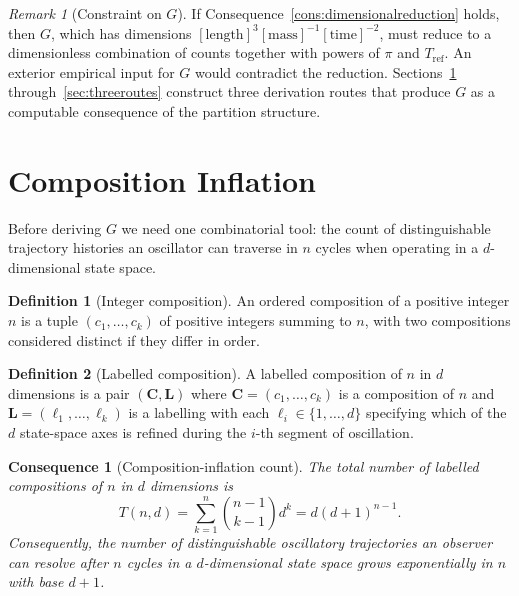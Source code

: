 \documentclass[11pt,twocolumn,a4paper]{article}
\theoremstyle{axiomstyle}
\theoremstyle{conseqstyle}
\newtheorem{consequence}{Consequence}
\theoremstyle{definition}
\newtheorem{definition}{Definition}
\theoremstyle{remark}
\newtheorem*{remark}{Remark}
\begin{document}
\begin{remark}[Constraint on $G$]
If Consequence~\ref{cons:dimensionalreduction} holds, then $G$, which has dimensions $[\text{length}]^{3}[\text{mass}]^{-1}[\text{time}]^{-2}$, must reduce to a dimensionless combination of counts together with powers of $\pi$ and $T_{\mathrm{ref}}$. An exterior empirical input for $G$ would contradict the reduction. Sections~\ref{sec:compositioninflationtheorem} through~\ref{sec:threeroutes} construct three derivation routes that produce $G$ as a computable consequence of the partition structure.
\end{remark}

\section{Composition Inflation}
\label{sec:compositioninflationtheorem}

Before deriving $G$ we need one combinatorial tool: the count of distinguishable trajectory histories an oscillator can traverse in $n$ cycles when operating in a $d$-dimensional state space.

\begin{definition}[Integer composition]
An ordered composition of a positive integer $n$ is a tuple $(c_{1},\ldots,c_{k})$ of positive integers summing to $n$, with two compositions considered distinct if they differ in order.
\end{definition}

\begin{definition}[Labelled composition]
A labelled composition of $n$ in $d$ dimensions is a pair $(\mathbf{C},\mathbf{L})$ where $\mathbf{C}=(c_{1},\ldots,c_{k})$ is a composition of $n$ and $\mathbf{L}=(\ell_{1},\ldots,\ell_{k})$ is a labelling with each $\ell_{i}\in\{1,\ldots,d\}$ specifying which of the $d$ state-space axes is refined during the $i$-th segment of oscillation.
\end{definition}

\begin{consequence}[Composition-inflation count]\label{cons:compositioninflation}
The total number of labelled compositions of $n$ in $d$ dimensions is
\begin{equation}
T(n,d)=\sum_{k=1}^{n}\binom{n-1}{k-1}d^{k}=d(d+1)^{n-1}.
\end{equation}
Consequently, the number of distinguishable oscillatory trajectories an observer can resolve after $n$ cycles in a $d$-dimensional state space grows exponentially in $n$ with base $d+1$.
\end{consequence}
\end{document}
